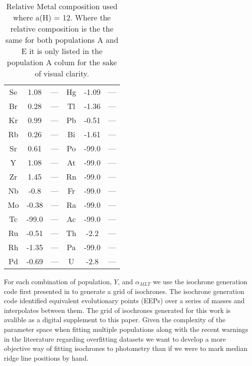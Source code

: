 \begin{table}
\begin{tabular}{c|cc||c|cc}
  Se & 1.08 & --- & Hg & -1.09 & --- \\
  Br & 0.28 & --- & Tl & -1.36 & --- \\
  Kr & 0.99 & --- & Pb & -0.51 & --- \\
  Rb & 0.26 & --- & Bi & -1.61 & --- \\
  Sr & 0.61 & --- & Po & -99.0 & --- \\
  Y & 1.08 & --- & At & -99.0 & --- \\
  Zr & 1.45 & --- & Rn & -99.0 & --- \\
  Nb & -0.8 & --- & Fr & -99.0 & --- \\
  Mo & -0.38 & --- & Ra & -99.0 & --- \\
  Tc & -99.0 & --- & Ac & -99.0 & --- \\
  Ru & -0.51 & --- & Th & -2.2 & --- \\
  Rh & -1.35 & --- & Pa & -99.0 & --- \\
  Pd & -0.69 & --- & U & -2.8 & ---
  \end{tabular}
  \caption{Relative Metal composition used where a(H) = 12. Where the relative composition is the the same for both populations A and E it is only listed in the population A colum for the sake of visual clarity.}
  \label{tab:comp}
\end{table}

For each combination of population, $Y$, and $\alpha_{MLT}$ we use the
isochrone generation code first presented in \citet{Dotter2016} to generate a
grid of isochrones. The isochrone generation code identified equivalent
evolutionary points (EEPs) over a series of masses and interpolates between
them. The grid of isochrones generated for this work is avalible as a digital
supplement to this paper. Given the complexity of the parameter space when
fitting multiple populations along with the recent warnings in the liteerature
regarding overfitting datasets \citep[e.g. ][]{Valle2022} we want to develop a
more objective way of fitting isochrones to photometry than if we were to mark
median ridge line positions by hand.

